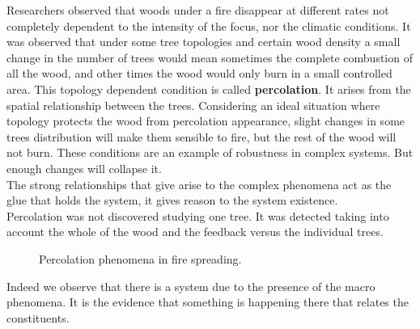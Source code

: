 \documentclass[11pt,oneside,a4paper,openright]{report}
\begin{document}

Researchers observed that woods under a fire disappear at different rates not completely dependent to the intensity
of the focus, nor the climatic conditions. It was observed that under some tree topologies and certain wood
density a small change in the number of trees would mean sometimes the complete combustion of all the wood, and
other times the wood would only burn in a small controlled area. This topology dependent condition is called
\textbf{percolation}. It arises from the spatial relationship between the trees. Considering an ideal situation
where topology protects the wood from percolation appearance, slight changes in some trees distribution will make
them sensible to fire, but the rest of the wood will not burn. These conditions are an example of robustness
in complex systems. But enough changes will collapse it.\\
The strong relationships that give arise to the complex phenomena act as the glue that holds the system, it gives
reason to the system existence.\\ 
Percolation was not discovered studying one tree. It was detected taking into account the whole of the wood and the feedback versus the individual trees.\\

\begin{figure}[h!]
\centering
\setlength\fboxsep{0pt}
\setlength\fboxrule{0.5pt}
\caption{ Percolation phenomena in fire spreading.}
\label{fig:percolation_1}
\end{figure}

Indeed we observe that there is a system due to the presence of the macro phenomena. It is the evidence that
something is happening there that relates the constituents.\\
\end{document}
